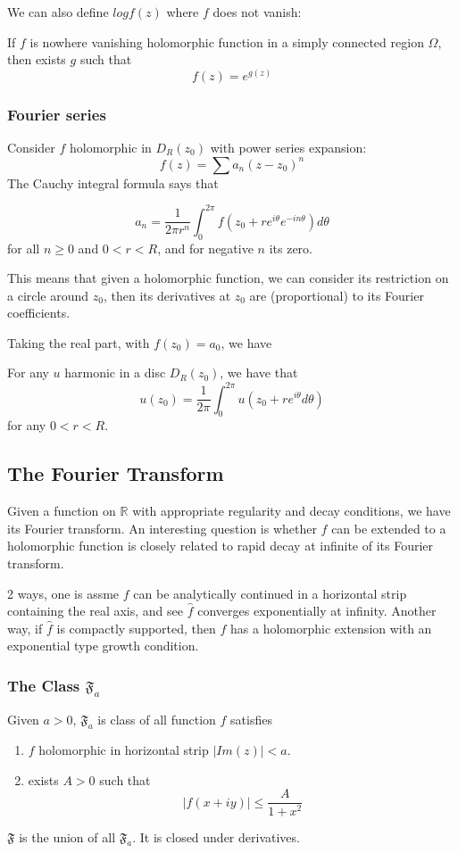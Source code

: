 \documentclass[main.tex]{subfiles}
\newcommand{\F}[1]{
\mathfrak{F}_{#1}}
\begin{document}
We can also define $log f(z)$ where $f$ does not vanish:

\begin{theorem}
If $f$ is nowhere vanishing holomorphic function in a simply connected region $\Omega$, then exists $g$ such that 
$$
f(z) = e^{g(z)}
$$
\end{theorem}

\subsubsection{Fourier series}
Consider $f$ holomorphic in $D_R(z_0)$ with power series expansion:
$$
f(z) = \sum a_n(z-z_0)^n
$$
The Cauchy integral formula says that
\begin{theorem}
$$
a_n = \frac{1}{2\pi r^n} \int_0 ^{2\pi} f(z_0 + r e^{i\theta} e^{-in\theta}) d\theta
$$
for all $n \geq 0$ and $0 < r < R$, and for negative $n$ its zero. 
\end{theorem}

This means that given a holomorphic function, we can consider its restriction on a circle around $z_0$, then its derivatives at $z_0$ are (proportional) to its Fourier coefficients.

Taking the real part, with $f(z_0) = a_0$, we have 
\begin{corollary}
For any $u$ harmonic in a disc $D_R(z_0)$, we have that 
$$
u(z_0) = \frac{1}{2\pi}\int_0 ^{2\pi} u(z_0 + re^{i \theta} d\theta)
$$
for any $0 < r < R$.
\end{corollary}

\subsection{The Fourier Transform}
Given a function on $\mathbb{R}$ with appropriate regularity and decay conditions, we have its Fourier transform. An interesting question is whether $f$ can be extended to a holomorphic function is closely related to rapid decay at infinite of its Fourier transform.

2 ways, one is assme $f$ can be analytically continued in a horizontal strip containing the real axis, and see $\hat{f}$ converges exponentially at infinity. Another way, if $\hat{f}$ is compactly supported, then $f$ has a holomorphic extension with an exponential type growth condition.

\subsubsection{The Class $\F{a}$}
\begin{definition}
Given $a > 0$, $\F{a}$ is class of all function $f$ satisfies
\begin{enumerate}
    \item $f$ holomorphic in horizontal strip $|Im(z)| < a$.
    \item exists $A> 0$ such that 
    $$
    |f(x+iy)| \leq \frac{A}{1 + x^2}
    $$
\end{enumerate}
\end{definition}
$\mathfrak{F}$ is the union of all $\F{a}$. It is closed under derivatives. 
\end{document}
